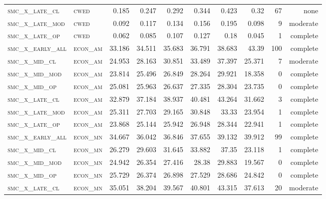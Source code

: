 \begin{landscape}
\begin{center}
\begin{footnotesize}
\begin{longtable}{llrrrrr|rrr}
\textsc{smc\_x\_late\_cl  } & \textsc{cwed      }   & 0.185    & 0.247    & 0.292    & 0.344    & 0.423    & 0.32     & 67  & none     \\
\textsc{smc\_x\_late\_mod } & \textsc{cwed      }   & 0.092    & 0.117    & 0.134    & 0.156    & 0.195    & 0.098    & 9   & moderate \\
\textsc{smc\_x\_late\_op  } & \textsc{cwed      }   & 0.062    & 0.085    & 0.107    & 0.127    & 0.18     & 0.045    & 1   & complete \\
\textsc{smc\_x\_early\_all} & \textsc{econ\_am  }   & 33.186   & 34.511   & 35.683   & 36.791   & 38.683   & 43.39    & 100 & complete \\
\textsc{smc\_x\_mid\_cl   } & \textsc{econ\_am  }   & 24.953   & 28.163   & 30.851   & 33.489   & 37.397   & 25.371   & 7   & moderate \\
\textsc{smc\_x\_mid\_mod  } & \textsc{econ\_am  }   & 23.814   & 25.496   & 26.849   & 28.264   & 29.921   & 18.358   & 0   & complete \\
\textsc{smc\_x\_mid\_op   } & \textsc{econ\_am  }   & 25.081   & 25.963   & 26.637   & 27.335   & 28.304   & 23.735   & 0   & complete \\
\textsc{smc\_x\_late\_cl  } & \textsc{econ\_am  }   & 32.879   & 37.184   & 38.937   & 40.481   & 43.264   & 31.662   & 3   & complete \\
\textsc{smc\_x\_late\_mod } & \textsc{econ\_am  }   & 25.311   & 27.703   & 29.165   & 30.848   & 33.33    & 23.954   & 1   & complete \\
\textsc{smc\_x\_late\_op  } & \textsc{econ\_am  }   & 23.868   & 25.144   & 25.942   & 26.948   & 28.344   & 22.941   & 1   & complete \\
\textsc{smc\_x\_early\_all} & \textsc{econ\_mn  }   & 34.667   & 36.042   & 36.846   & 37.655   & 39.132   & 39.912   & 99  & complete \\
\textsc{smc\_x\_mid\_cl   } & \textsc{econ\_mn  }   & 26.279   & 29.603   & 31.645   & 33.882   & 37.35    & 23.118   & 1   & complete \\
\textsc{smc\_x\_mid\_mod  } & \textsc{econ\_mn  }   & 24.942   & 26.354   & 27.416   & 28.38    & 29.883   & 19.567   & 0   & complete \\
\textsc{smc\_x\_mid\_op   } & \textsc{econ\_mn  }   & 25.729   & 26.374   & 26.898   & 27.529   & 28.686   & 24.842   & 0   & complete \\
\textsc{smc\_x\_late\_cl  } & \textsc{econ\_mn  }   & 35.051   & 38.204   & 39.567   & 40.801   & 43.315   & 37.613   & 20  & moderate \\

\end{longtable}
\end{footnotesize}
\end{center}
\end{landscape}
